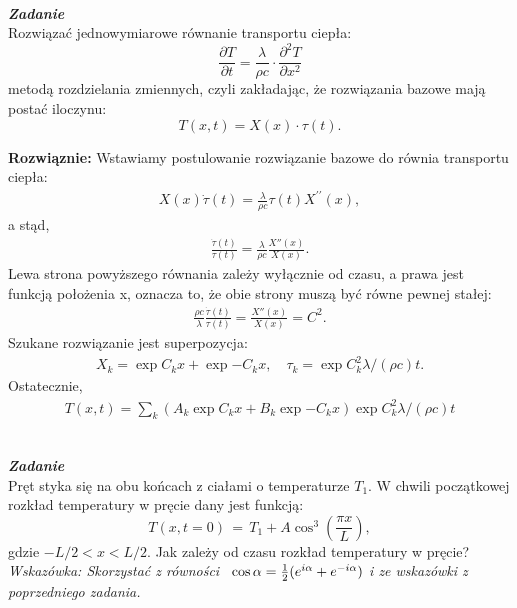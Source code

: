 \documentclass[11pt,a4paper]{article}
\newcounter{zadanie}\newcommand{\zadanie}[1][]{\addtocounter{zadanie}{1} ~\\  {\bf \emph{Zadanie \arabic{zadanie} #1 }} \\}
\begin{document}
\newpage

\zadanie
Rozwiązać jednowymiarowe równanie transportu ciepła:
\[ \frac{\partial T}{\partial t} = \frac{\lambda}{\rho c}\cdot
                                   \frac{\partial^2 T}{\partial x^2} \]
metodą rozdzielania zmiennych, czyli zakładając, że rozwiązania
bazowe mają postać iloczynu:
\[ T(x,t) = X(x)\cdot{\displaystyle \tau}(t).\]

\vspace{0.2cm}
\textbf{Rozwiąznie:} 
Wstawiamy postulowanie rozwiązanie bazowe do równia transportu ciepła:
\begin{align}
X(x) \dot{\tau}(t) = \frac{\lambda}{\rho c} \tau(t) X^{\prime \prime}(x), 
\end{align}
a stąd,
\begin{align}
\frac{\dot{\tau}(t)}{\tau(t)}= \frac{\lambda}{\rho c} \frac{X''(x)}{X(x)}.
\end{align}
Lewa strona powyższego równania zależy wyłącznie od czasu, a prawa jest funkcją położenia x, oznacza to, że obie strony muszą być równe pewnej stałej:
\begin{align}
\frac{\rho c}{\lambda}  \frac{\dot{\tau}(t)}{\tau(t)}= \frac{X''(x)}{X(x)}= C^2.
\end{align}
Szukane rozwiązanie jest superpozycja:
\begin{align}
X_k = \exp{C_k x} + \exp{-C_k x}, \quad \tau_k = \exp{C_k^2 \lambda /(\rho c) t}.
\end{align} 
Ostatecznie, 
\begin{align}
T(x, t) = \sum_k \left( A_k \exp{C_k x} + B_k \exp{-C_k x} \right) \exp{C_k^2 \lambda /(\rho c) t} \label{eq:roz}
\end{align}

\newpage
 
\zadanie
Pręt styka się na obu końcach z ciałami o temperaturze $T_1$.
W chwili początkowej rozkład temperatury w pręcie dany jest funkcją:
\[ T(x,t=0) \,=\, T_1 + A \cos^3 \left(\frac{\pi x}{L}\right), \]
gdzie $-L/2 < x < L/2$.
Jak zależy od czasu rozkład temperatury w pręcie?\\[1mm]
{\em Wskazówka: Skorzystać z równości
~$\cos{\alpha} = {1\over 2} (e^{i\alpha}+e^{-i\alpha})$ i ze wskazówki z poprzedniego zadania.}
\end{document}

